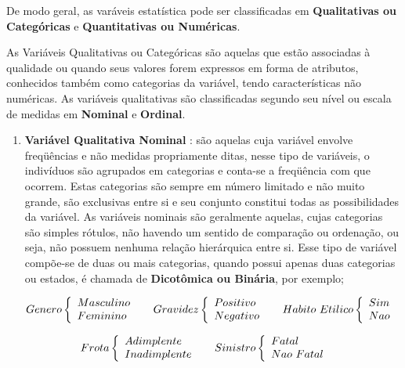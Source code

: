 De modo geral, as varáveis estatística pode ser classificadas em \textbf{Qualitativas ou Categóricas} e \textbf{Quantitativas ou Numéricas}.\vskip0.3cm

As Variáveis Qualitativas ou Categóricas são aquelas que estão associadas à qualidade ou quando seus valores forem expressos em forma de atributos, conhecidos também como categorias da variável, tendo características não numéricas. As variáveis qualitativas são classificadas segundo seu nível ou escala de medidas em \textbf{Nominal} e \textbf{Ordinal}.\vskip0.3cm

\begin{enumerate}
\item \textbf{Variável Qualitativa Nominal} : são aquelas cuja variável envolve fre\-qüên\-cias e não medidas propriamente ditas, nesse tipo de variáveis, o indivíduos são agrupados em categorias e conta-se a freqüência com que ocorrem. Estas categorias são sempre em número limitado e não muito grande, são exclusivas entre si e seu conjunto constitui todas as possibilidades da variável. As variáveis nominais são geralmente aquelas, cujas categorias são simples rótulos, não havendo um sentido de comparação ou ordenação, ou seja, não possuem nenhuma relação hierárquica entre si. Esse tipo de variável compõe-se de duas ou mais categorias, quando possui apenas duas categorias ou estados, é chamada de \textbf{Dicotômica ou Binária}, por exemplo;

$$
    Genero
    \left\{
    \begin{array}{ll}
    Masculino & \hbox{ } \\
    Feminino & \hbox{ }
    \end{array}
    \right.
  Gravidez
    \left\{
    \begin{array}{ll}
    Positivo & \hbox{ } \\
    Negativo & \hbox{ }
    \end{array}
    \right.
    Habito \ Etilico
    \left\{
    \begin{array}{ll}
    Sim & \hbox{ } \\
    Nao & \hbox{ }
    \end{array}
    \right.
    $$

    $$
    Frota
    \left\{
    \begin{array}{ll}
    Adimplente    & \hbox{ } \\
    Inadimplente  & \hbox{ }
    \end{array}
    \right.
     Sinistro
    \left\{
    \begin{array}{ll}
    Fatal     & \hbox{ } \\
    Nao \ Fatal & \hbox{ }
    \end{array}
    \right.
    $$


\end{enumerate}
